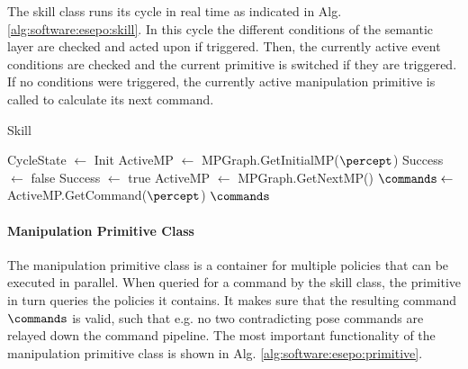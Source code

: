 The skill class runs its cycle in real time as indicated in Alg. \ref{alg:software:esepo:skill}.
In this cycle the different conditions of the semantic layer are checked and acted upon if triggered.
Then, the currently active event conditions are checked and the current primitive is switched if they are triggered.
If no conditions were triggered, the currently active manipulation primitive is called to calculate its next command.

\begin{algorithm}
\caption{Skill}\label{alg:software:esepo:skill}
\begin{algorithmic}[1]
\State CycleState $\gets$ Init
\State ActiveMP $\gets$ MPGraph.GetInitialMP($\percept$)
\State Success $\gets$ false
\EndProcedure
{}
	\Else
	\EndIf
\EndIf
{}
\EndIf
{}
	\EndIf
		\State Success $\gets$ true
	\EndIf
	\EndIf
		\State ActiveMP $\gets$ MPGraph.GetNextMP()
	\EndIf
	\State $\commands \gets $ ActiveMP.GetCommand($\percept$)
\EndIf
\Return $\commands$
\EndProcedure
\end{algorithmic}
\end{algorithm}

\paragraph{Manipulation Primitive Class}

The manipulation primitive class is a container for multiple policies that can be executed in parallel.
When queried for a command by the skill class, the primitive in turn queries the policies it contains.
It makes sure that the resulting command $\commands$ is valid, such that e.g. no two contradicting pose commands are relayed down the command pipeline.
The most important functionality of the manipulation primitive class is shown in Alg. \ref{alg:software:esepo:primitive}.

